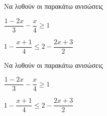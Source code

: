 Να λυθούν οι παρακάτω ανισώσεις
\begin{alist}
\item $ \dfrac{1-2x}{3}-\dfrac{x}{4}\geq 1 $
\item $ 1-\dfrac{x+1}{4}\leq 2-\dfrac{2x+3}{2} $
\end{alist}
Να λυθούν οι παρακάτω ανισώσεις
\begin{alist}
\item $ \dfrac{1-2x}{3}-\dfrac{x}{4}\geq 1 $
\item $ 1-\dfrac{x+1}{4}\leq 2-\dfrac{2x+3}{2} $
\end{alist}
